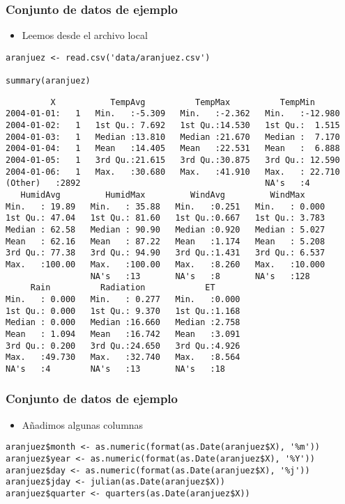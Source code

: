 \documentclass[xcolor={usenames,svgnames,dvipsnames}]{beamer}
\begin{document}
\begin{frame}[fragile]
\frametitle{Conjunto de datos de ejemplo}
\label{sec-1-1-2}

\begin{itemize}
\item Leemos desde el archivo local
\end{itemize}

\lstset{language=R}
\begin{lstlisting}
aranjuez <- read.csv('data/aranjuez.csv')

summary(aranjuez)
\end{lstlisting}


\begin{verbatim}
         X           TempAvg          TempMax          TempMin       
2004-01-01:   1   Min.   :-5.309   Min.   :-2.362   Min.   :-12.980  
2004-01-02:   1   1st Qu.: 7.692   1st Qu.:14.530   1st Qu.:  1.515  
2004-01-03:   1   Median :13.810   Median :21.670   Median :  7.170  
2004-01-04:   1   Mean   :14.405   Mean   :22.531   Mean   :  6.888  
2004-01-05:   1   3rd Qu.:21.615   3rd Qu.:30.875   3rd Qu.: 12.590  
2004-01-06:   1   Max.   :30.680   Max.   :41.910   Max.   : 22.710  
(Other)   :2892                                     NA's   :4        
   HumidAvg         HumidMax         WindAvg         WindMax      
Min.   : 19.89   Min.   : 35.88   Min.   :0.251   Min.   : 0.000  
1st Qu.: 47.04   1st Qu.: 81.60   1st Qu.:0.667   1st Qu.: 3.783  
Median : 62.58   Median : 90.90   Median :0.920   Median : 5.027  
Mean   : 62.16   Mean   : 87.22   Mean   :1.174   Mean   : 5.208  
3rd Qu.: 77.38   3rd Qu.: 94.90   3rd Qu.:1.431   3rd Qu.: 6.537  
Max.   :100.00   Max.   :100.00   Max.   :8.260   Max.   :10.000  
                 NA's   :13       NA's   :8       NA's   :128     
     Rain          Radiation            ET       
Min.   : 0.000   Min.   : 0.277   Min.   :0.000  
1st Qu.: 0.000   1st Qu.: 9.370   1st Qu.:1.168  
Median : 0.000   Median :16.660   Median :2.758  
Mean   : 1.094   Mean   :16.742   Mean   :3.091  
3rd Qu.: 0.200   3rd Qu.:24.650   3rd Qu.:4.926  
Max.   :49.730   Max.   :32.740   Max.   :8.564  
NA's   :4        NA's   :13       NA's   :18
\end{verbatim}
\end{frame}
\begin{frame}[fragile]
\frametitle{Conjunto de datos de ejemplo}
\label{sec-1-1-3}

\begin{itemize}
\item Añadimos algunas columnas
\end{itemize}

\lstset{language=R}
\begin{lstlisting}
aranjuez$month <- as.numeric(format(as.Date(aranjuez$X), '%m'))
aranjuez$year <- as.numeric(format(as.Date(aranjuez$X), '%Y'))
aranjuez$day <- as.numeric(format(as.Date(aranjuez$X), '%j'))
aranjuez$jday <- julian(as.Date(aranjuez$X))
aranjuez$quarter <- quarters(as.Date(aranjuez$X))
\end{lstlisting}
\end{frame}
\end{document}
